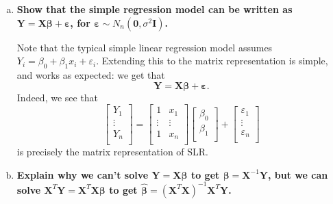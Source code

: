 \begin{enumerate}[a)]
\item \textbf{Show that the simple regression model can be written as $\bm{Y} = \bm{X\beta} + \bm{\varepsilon}$, for $\bm{\varepsilon} \sim N_n(\bm{0}, \sigma^2\bm{I})$.}

Note that the typical simple linear regression model assumes $Y_i = \beta_0 + \beta_1 x_i + \varepsilon_i$. Extending this to the matrix representation is simple,
and works as expected: we get that
\[
    \bm{Y} = \bm{X\bm{\beta}} + \bm{\varepsilon}.
\]
Indeed, we see that
\[
    \begin{bmatrix}
        Y_1 \\
        \vdots \\
        Y_n \\
    \end{bmatrix} 
    = \begin{bmatrix}
        1 & x_1 \\
        \vdots & \vdots  \\
        1 & x_n  \\
    \end{bmatrix}
    \begin{bmatrix}
        \beta_0 \\
        \beta_1  \\
    \end{bmatrix}
    + \begin{bmatrix}
        \varepsilon_1 \\
        \vdots \\
        \varepsilon_n \\
    \end{bmatrix}
\]
is precisely the matrix representation of SLR. \\

\item \textbf{Explain why we can't solve $\bm{Y} = \bm{X\beta}$ to get $\bm{\beta} = \bm{X}^{-1}\bm{Y}$, but we can solve $\bm{X}^T \bm{Y} = \bm{X}^T \bm{X} \bm{\beta}$
to get $\hat{\bm{\beta}} = (\bm{X}^T \bm{X})^{-1} \bm{X}^T \bm{Y}$.}


\end{enumerate}
